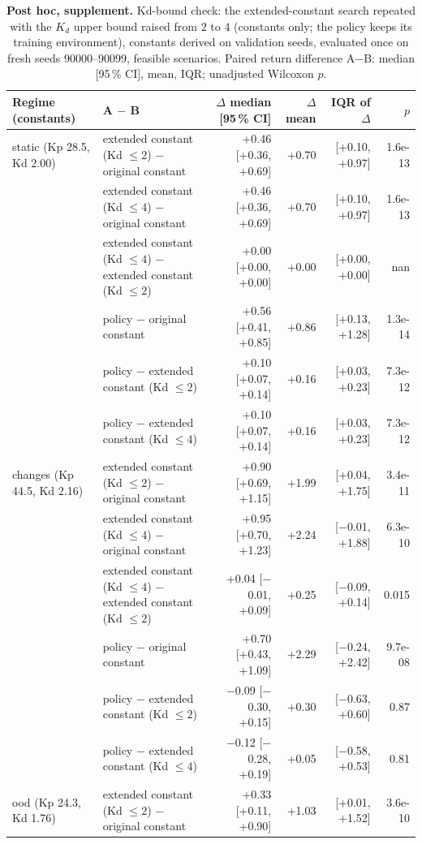 \begin{table}[t]
\centering
\small
\caption{\textbf{Post hoc, supplement.} Kd-bound check: the extended-constant search repeated with the $K_d$ upper bound raised from $2$ to $4$ (constants only; the policy keeps its training environment), constants derived on validation seeds, evaluated once on fresh seeds 90000--90099, feasible scenarios. Paired return difference A$-$B: median [95\,\% CI], mean, IQR; unadjusted Wilcoxon $p$.}
\label{tab:kdbound}
\begin{tabular}{llrrrr}
\toprule
Regime (constants) & A $-$ B & $\Delta$ median [95\,\% CI] & $\Delta$ mean & IQR of $\Delta$ & $p$\\
\midrule
static (Kp 28.5, Kd 2.00) & extended constant (Kd $\le2$) $-$ original constant & +0.46 [+0.36, +0.69] & +0.70 & [+0.10, +0.97] & 1.6e-13\\
 & extended constant (Kd $\le4$) $-$ original constant & +0.46 [+0.36, +0.69] & +0.70 & [+0.10, +0.97] & 1.6e-13\\
 & extended constant (Kd $\le4$) $-$ extended constant (Kd $\le2$) & +0.00 [+0.00, +0.00] & +0.00 & [+0.00, +0.00] & nan\\
 & policy $-$ original constant & +0.56 [+0.41, +0.85] & +0.86 & [+0.13, +1.28] & 1.3e-14\\
 & policy $-$ extended constant (Kd $\le2$) & +0.10 [+0.07, +0.14] & +0.16 & [+0.03, +0.23] & 7.3e-12\\
 & policy $-$ extended constant (Kd $\le4$) & +0.10 [+0.07, +0.14] & +0.16 & [+0.03, +0.23] & 7.3e-12\\
\midrule
changes (Kp 44.5, Kd 2.16) & extended constant (Kd $\le2$) $-$ original constant & +0.90 [+0.69, +1.15] & +1.99 & [+0.04, +1.75] & 3.4e-11\\
 & extended constant (Kd $\le4$) $-$ original constant & +0.95 [+0.70, +1.23] & +2.24 & [$-$0.01, +1.88] & 6.3e-10\\
 & extended constant (Kd $\le4$) $-$ extended constant (Kd $\le2$) & +0.04 [$-$0.01, +0.09] & +0.25 & [$-$0.09, +0.14] & 0.015\\
 & policy $-$ original constant & +0.70 [+0.43, +1.09] & +2.29 & [$-$0.24, +2.42] & 9.7e-08\\
 & policy $-$ extended constant (Kd $\le2$) & $-$0.09 [$-$0.30, +0.15] & +0.30 & [$-$0.63, +0.60] & 0.87\\
 & policy $-$ extended constant (Kd $\le4$) & $-$0.12 [$-$0.28, +0.19] & +0.05 & [$-$0.58, +0.53] & 0.81\\
\midrule
ood (Kp 24.3, Kd 1.76) & extended constant (Kd $\le2$) $-$ original constant & +0.33 [+0.11, +0.90] & +1.03 & [+0.01, +1.52] & 3.6e-10\\

\end{tabular}
\end{table}
